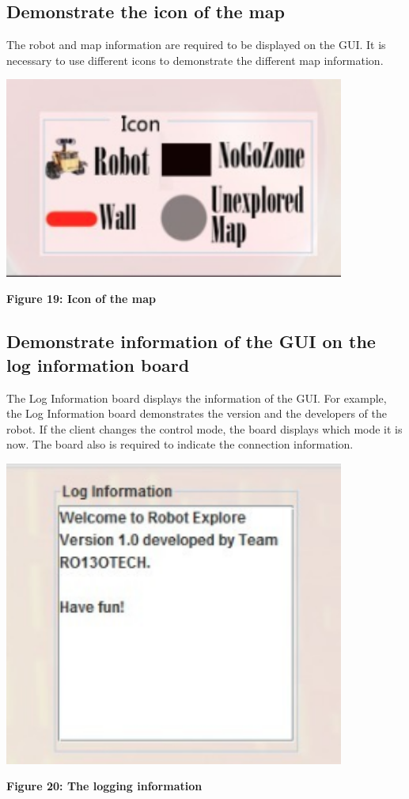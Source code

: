 \documentclass[11pt, a4paper]{report}
\begin{document}
\subsection{Demonstrate the icon of the map}
The robot and map information are required to be displayed on the GUI. It is necessary to use different icons to demonstrate the different map information.
  \begin{center}
 \includegraphics[width=11.20cm]{icon}
\end{center}
\begin{center}
\textbf {Figure 19: Icon of the map} \\[0.3cm]
\end{center}
\subsection{Demonstrate information of the GUI on the log information board}
The Log Information board displays the information of the GUI. For example, the Log Information board demonstrates the version and the developers of the robot. If the client changes the control mode, the board displays which mode it is now. The board also is required to indicate the connection information.
  \begin{center}
 \includegraphics[width=11.20cm]{board}
\end{center}
\begin{center}
\textbf {Figure 20: The logging information} \\[0.3cm]
\end{center}
\end{document}
